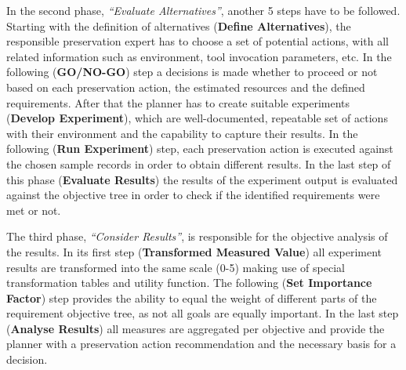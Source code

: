 In the second phase, \textit{``Evaluate Alternatives''}, another 5 steps have to be followed. Starting with the definition of alternatives (\textbf{Define Alternatives}), the responsible preservation expert has to choose a set of potential actions, with all related information such as environment, tool invocation parameters, etc. In the following (\textbf{GO/NO-GO}) step a decisions is made whether to proceed or not based on each preservation action, the estimated resources and the defined requirements. After that the planner has to create suitable experiments (\textbf{Develop Experiment}), which are well-documented, repeatable set of actions with their environment and the capability to capture their results. In the following (\textbf{Run Experiment}) step, each preservation action is executed against the chosen sample records in order to obtain different results. In the last step of this phase (\textbf{Evaluate Results}) the results of the experiment output is evaluated against the objective tree in order to check if the identified requirements were met or not.

The third phase, \textit{``Consider Results''}, is responsible for the objective analysis of the results. In its first step (\textbf{Transformed Measured Value}) all experiment results are transformed into the same scale (0-5) making use of special transformation tables and utility function. The following (\textbf{Set Importance Factor}) step provides the ability to equal the weight of different parts of the requirement objective tree, as not all goals are equally important. In the last step (\textbf{Analyse Results}) all measures are aggregated per objective and provide the planner with a preservation action recommendation and the necessary basis for a decision.

